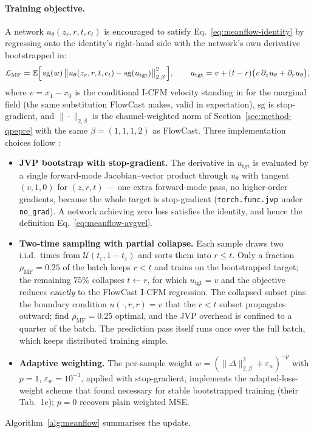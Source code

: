 \paragraph{Training objective.} A network $u_\theta(z_r, r, t, c_t)$ is encouraged to satisfy Eq.~\eqref{eq:meanflow-identity} by regressing onto the identity's right-hand side with the network's own derivative bootstrapped in:
\begin{equation}
  \mathcal{L}_{\text{MF}}
  = \mathbb{E}\Bigl[\, \mathrm{sg}(w)\, \bigl\| u_\theta(z_r, r, t, c_t) - \mathrm{sg}(u_{\text{tgt}}) \bigr\|_{2,\beta}^2 \,\Bigr],
  \qquad
  u_{\text{tgt}} = v + (t - r)\bigl( v\, \partial_z u_\theta + \partial_r u_\theta \bigr),
  \label{eq:meanflow-loss}
\end{equation}
where $v = x_1 - x_0$ is the conditional I-CFM velocity standing in for the marginal field (the same substitution FlowCast makes, valid in expectation), $\mathrm{sg}$ is stop-gradient, and $\|\cdot\|_{2,\beta}$ is the channel-weighted norm of Section~\ref{sec:method-qpepre} with the same $\beta = (1, 1, 1, 2)$ as FlowCast. Three implementation choices follow \citet{geng2025meanflow}:
\begin{itemize}
  \item \textbf{JVP bootstrap with stop-gradient.} The derivative in $u_{\text{tgt}}$ is evaluated by a single forward-mode Jacobian--vector product through $u_\theta$ with tangent $(v, 1, 0)$ for $(z, r, t)$ --- one extra forward-mode pass, no higher-order gradients, because the whole target is stop-gradient (\texttt{torch.func.jvp} under \texttt{no\_grad}). A network achieving zero loss satisfies the identity, and hence the definition Eq.~\eqref{eq:meanflow-avgvel}.
  \item \textbf{Two-time sampling with partial collapse.} Each sample draws two i.i.d.\ times from $\mathcal{U}(t_\varepsilon, 1 - t_\varepsilon)$ and sorts them into $r \le t$. Only a fraction $\rho_{\text{MF}} = 0.25$ of the batch keeps $r < t$ and trains on the bootstrapped target; the remaining $75\%$ collapses $t \leftarrow r$, for which $u_{\text{tgt}} = v$ and the objective reduces \emph{exactly} to the FlowCast I-CFM regression. The collapsed subset pins the boundary condition $u(\cdot, r, r) = v$ that the $r < t$ subset propagates outward; \citet{geng2025meanflow} find $\rho_{\text{MF}} = 0.25$ optimal, and the JVP overhead is confined to a quarter of the batch. The prediction pass itself runs once over the full batch, which keeps distributed training simple.
  \item \textbf{Adaptive weighting.} The per-sample weight $w = (\|\Delta\|_{2,\beta}^2 + \varepsilon_w)^{-p}$ with $p = 1$, $\varepsilon_w = 10^{-3}$, applied with stop-gradient, implements the adapted-loss-weight scheme that \citet{geng2025meanflow} found necessary for stable bootstrapped training (their Tab.~1e); $p = 0$ recovers plain weighted MSE.
\end{itemize}
Algorithm~\ref{alg:meanflow} summarises the update.

